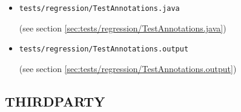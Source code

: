 \documentclass[a4paper, 10pt, titlepage]{scrartcl} %
\begin{document}
\begin{itemize}
 \item \begin{scriptsize}\verb|tests|\hspace{0.0pt}\verb|/|\hspace{0.0pt}\verb|regression|\hspace{0.0pt}\verb|/|\hspace{0.0pt}\verb|TestAnnotations|\hspace{0.0pt}\verb|.|\hspace{0.0pt}\verb|java|\end{scriptsize} (see section \ref{sec:tests/regression/TestAnnotations.java})
 \item \begin{scriptsize}\verb|tests|\hspace{0.0pt}\verb|/|\hspace{0.0pt}\verb|regression|\hspace{0.0pt}\verb|/|\hspace{0.0pt}\verb|TestAnnotations|\hspace{0.0pt}\verb|.|\hspace{0.0pt}\verb|output|\end{scriptsize} (see section \ref{sec:tests/regression/TestAnnotations.output})
\end{itemize}

\subsection{THIRDPARTY}
\label{sec:THIRDPARTY}
\end{document}
